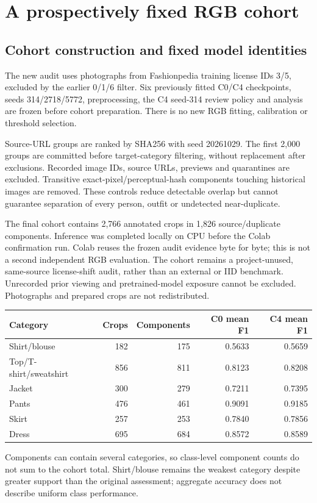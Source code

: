 \clearpage
\section{A prospectively fixed RGB cohort}\label{sec:prospective-rgb}\label{sec:prospective-followup}
\subsection{Cohort construction and fixed model identities}
The new audit uses photographs from Fashionpedia training license IDs 3/5, excluded by the earlier 0/1/6 filter. Six previously fitted C0/C4 checkpoints, seeds 314/2718/5772, preprocessing, the C4 seed-314 review policy and analysis are frozen before cohort preparation. There is no new RGB fitting, calibration or threshold selection.

Source-URL groups are ranked by SHA256 with seed 20261029. The first 2,000 groups are committed before target-category filtering, without replacement after exclusions. Recorded image IDs, source URLs, previews and quarantines are excluded. Transitive exact-pixel/perceptual-hash components touching historical images are removed. These controls reduce detectable overlap but cannot guarantee separation of every person, outfit or undetected near-duplicate.

The final cohort contains 2,766 annotated crops in 1,826 source/duplicate components. Inference was completed locally on CPU before the Colab confirmation run. Colab reuses the frozen audit evidence byte for byte; this is not a second independent RGB evaluation. The cohort remains a project-unused, same-source license-shift audit, rather than an external or IID benchmark. Unrecorded prior viewing and pretrained-model exposure cannot be excluded. Photographs and prepared crops are not redistributed.

\begin{center}\small
\begin{tabular}{lrrrr}\toprule
Category & Crops & Components & C0 mean F1 & C4 mean F1\\\midrule
Shirt/blouse & 182 & 175 & 0.5633 & 0.5659\\
Top/T-shirt/sweatshirt & 856 & 811 & 0.8123 & 0.8208\\
Jacket & 300 & 279 & 0.7211 & 0.7395\\
Pants & 476 & 461 & 0.9091 & 0.9185\\
Skirt & 257 & 253 & 0.7840 & 0.7856\\
Dress & 695 & 684 & 0.8572 & 0.8589\\\bottomrule
\end{tabular}\end{center}
Components can contain several categories, so class-level component counts do not sum to the cohort total. Shirt/blouse remains the weakest category despite greater support than the original assessment; aggregate accuracy does not describe uniform class performance.

